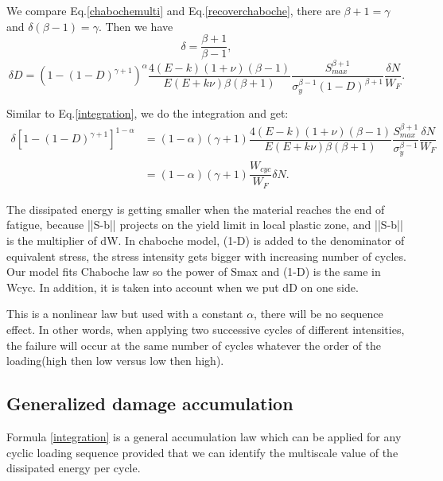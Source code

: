 \documentclass[3p,times,number,review]{elsarticle}
\begin{document}
We compare Eq.\eqref{chabochemulti} and Eq.\eqref{recoverchaboche}, there are $\beta+1=\gamma$ and $\delta\left( \beta-1\right) =\gamma$. Then we have 
\begin{equation}
\delta=\dfrac{\beta+1}{\beta-1},
\label{delta}
\end{equation}
\begin{equation}
	  \delta D= \left( 1 -(1-D)^{\gamma+1}\right)^\alpha \dfrac{4(E-k)(1+\nu)\left( \beta-1\right) }{ E(E+k\nu)\beta\left( \beta+1\right) }\dfrac{S_{max}^{\beta+1}}{ \sigma_y^{\beta-1}\left(1-D\right)^{\beta+1}}\dfrac{\delta N}{W_F}.
	  \label{wcycstar}
\end{equation} 

Similar to Eq.\eqref{integration}, we do the integration and get:
\begin{equation}
\begin{split}
	\delta[1-(1-D)^{\gamma+1}]^{1-\alpha}&=(1-\alpha)(\gamma+1)\dfrac{4(E-k)(1+\nu)\left( \beta-1\right) }{ E(E+k\nu)\beta\left( \beta+1\right)}\dfrac{S_{max}^{\beta+1}}{ \sigma_y^{\beta-1}}\dfrac{\delta N}{W_F}
	\\&=(1-\alpha)(\gamma+1)\dfrac{W_{cyc}}{W_F}\delta N.
	\end{split}
\label{integrationW}
\end{equation}




The dissipated energy is getting smaller when the material reaches the end of fatigue, because ||S-b|| projects on the yield limit in local plastic zone, and ||S-b|| is the multiplier of dW. In chaboche model, (1-D) is added to the denominator of equivalent stress, the stress intensity gets bigger with increasing number of cycles. Our model fits Chaboche law so the power of Smax and (1-D) is the same in Wcyc. In addition, it is taken into account when we put dD on one side.

This is a nonlinear law but used with a constant $\alpha$, there will be no sequence effect. In other words,
 when applying two successive cycles of different intensities, the failure will occur at the same number of cycles whatever the order of the loading(high then low versus low then high).
 
\subsection{Generalized damage accumulation}
Formula \eqref{integration} is a general accumulation law which can be applied for any cyclic loading sequence provided that we can identify the multiscale value of the dissipated energy per cycle. 
\end{document}
